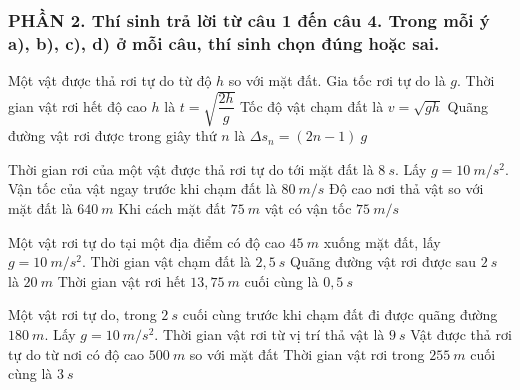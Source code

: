 \subsubsection*{PHẦN 2. Thí sinh trả lời từ câu 1 đến câu 4. Trong mỗi ý a), b), c), d) ở mỗi câu, thí sinh chọn đúng hoặc sai.}
\setcounter{ex}{0}
\begin{ex}%
Một vật được thả rơi tự do từ độ $h$ so với mặt đất. Gia tốc rơi tự do là $g$.
{\True Thời gian vật rơi hết độ cao $h$ là $t=\sqrt{\dfrac{2h}{g}}$} 
{Tốc độ vật chạm đất là $v=\sqrt{gh}$} 
{Quãng đường vật rơi được trong giây thứ $n$ là $\Delta s_{n}=(2 n-1)\ g$} 
\loigiai{ 
\begin{itemchoice}
\itemch
\itemch
\itemch
\itemch
\end{itemchoice}
}
\end{ex}

\begin{ex}%
Thời gian rơi của một vật được thả rơi tự do tới mặt đất là $8\ s$. Lấy $g=10\ m/s^2$.
{\True Vận tốc của vật ngay trước khi chạm đất là $80\ m/s$} 
{Độ cao nơi thả vật so với mặt đất là $640\ m$} 
{Khi cách mặt đất $75\ m$ vật có vận tốc $75 \ m/s$} 
\loigiai{
\begin{itemchoice}
\itemch
\itemch
\itemch
\itemch
\end{itemchoice}
}
\end{ex}
\begin{ex}%
Một vật rơi tự do tại một địa điểm có độ cao $45\ m$ xuống mặt đất, lấy $g=10 \ m/s^2$.
{Thời gian vật chạm đất là $2,5\ s$} 
{\True Quãng đường vật rơi được sau $2\ s$ là $20\ m$} 
{\True Thời gian vật rơi hết $13,75 \ m$ cuối cùng là $0,5\ s$} 
\loigiai{ 
\begin{itemchoice}
\itemch
\itemch
\itemch
\itemch
\end{itemchoice}
}
\end{ex}
\begin{ex}%
Một vật rơi tự do, trong $2\ s$ cuối cùng trước khi chạm đất đi được quãng đường $180\ m$. Lấy $g=10\ m/s^2$.
{Thời gian vật rơi từ vị trí thả vật là $9\ s$} 
{\True Vật được thả rơi tự do từ nơi có độ cao $500\ m$ so với mặt đất} 
{\True Thời gian vật rơi trong $255\ m$ cuối cùng là $3\ s$} 
\loigiai{
\begin{itemchoice}
\itemch
\itemch
\itemch
\itemch
\end{itemchoice}
}
\end{ex}












